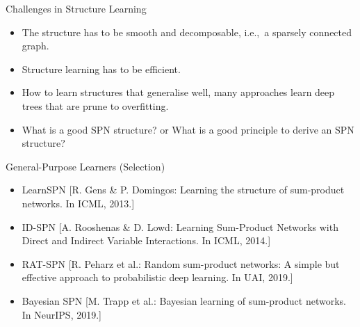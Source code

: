 \begin{frame}{Challenges in Structure Learning}
\begin{itemize}
    \item The structure has to be smooth and decomposable, i.e.,~a sparsely connected graph.
    \item Structure learning has to be efficient.
    \item How to learn structures that generalise well, many approaches learn deep trees that are prune to overfitting.
    \item What is a good SPN structure? or What is a good principle to derive an SPN structure?
\end{itemize}
\end{frame}

\begin{frame}{General-Purpose Learners (Selection)}{}
\begin{itemize}
    \item LearnSPN {\scriptsize [R. Gens \& P. Domingos: Learning the structure of sum-product networks. In ICML, 2013.]}
    \item ID-SPN {\scriptsize [A. Rooshenas \& D. Lowd: Learning Sum-Product Networks with Direct and Indirect Variable Interactions. In ICML, 2014.]}
    \item RAT-SPN {\scriptsize [R. Peharz et al.: Random sum-product networks: A simple but effective approach to probabilistic deep learning. In UAI, 2019.]}
    \item Bayesian SPN {\scriptsize [M. Trapp et al.: Bayesian learning of sum-product networks. In NeurIPS, 2019.]}
\end{itemize}
\end{frame}


